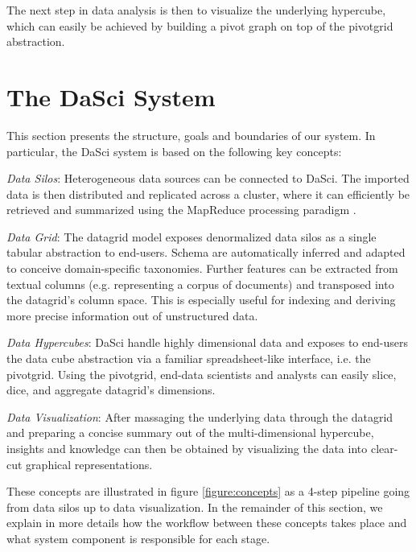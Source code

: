 \documentclass[10pt, a4paper, twocolumn]{article} %
\begin{document}
The next step in data analysis is then to visualize the underlying hypercube, which can easily be achieved by building a pivot graph on top of the pivotgrid abstraction.



\section{The DaSci System}
\label{section:system}

This section presents the structure, goals and boundaries of our system. 
In particular, the DaSci system is based on the following key concepts: \\

\begin{compactitem}
\item{\textit{Data Silos}}: Heterogeneous data sources can be connected to DaSci. The imported data is then distributed and replicated across a cluster, where it can efficiently be retrieved and summarized using the MapReduce processing paradigm \cite{map-reduce}. \\
\item{\textit{Data Grid}}: The datagrid model exposes denormalized data silos as a single tabular abstraction to end-users. Schema are automatically inferred and adapted to conceive domain-specific taxonomies. Further features can be extracted from textual columns (e.g. representing a corpus of documents) and transposed into the datagrid's column space. This is especially useful for indexing and deriving more precise information out of unstructured data. \\
\item{\textit{Data Hypercubes}}: DaSci handle highly dimensional data and exposes to end-users the data cube abstraction via a familiar spreadsheet-like interface, i.e. the pivotgrid. Using the pivotgrid, end-data scientists and analysts can easily slice, dice, and aggregate datagrid's dimensions. \\
\item{\textit{Data Visualization}}: After massaging the underlying data through the datagrid and preparing a concise summary out of the multi-dimensional hypercube, insights and knowledge can then be obtained by visualizing the data into clear-cut graphical representations. \\
\end{compactitem}

These concepts are illustrated in figure \ref{figure:concepts} as a 4-step pipeline going from data silos up to data visualization. In the remainder of this section, we explain in more details how the workflow between these concepts takes place and what system component is responsible for each stage.
\end{document}
